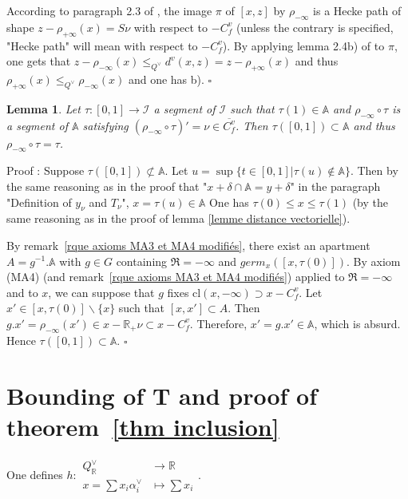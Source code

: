 \documentclass[12pt]{article}
\theoremstyle{plain}
\newtheorem{lemme}[thm]{Lemma}
\theoremstyle{definition}
\newcommand{\R}{\mathbb{R}}
\newcommand{\A}{\mathbb{A}}
\begin{document}
According to paragraph 2.3 of \cite{gaussent2014spherical}, the image $\pi$ of $[x,z]$ by $\rho_{-\infty}$ is a Hecke path of shape $z-\rho_{+\infty}(x)=S\nu$ with respect to $-C^v_f$ (unless the contrary is specified, "Hecke path" will mean with respect to $-C^v_f$). By applying lemma 2.4b) of \cite{gaussent2014spherical} to $\pi$, one gets that $z-\rho_{-\infty}(x)\leq _{Q^\vee} d^v(x,z)=z-\rho_{+\infty}(x)$ and thus $\rho_{+\infty}(x)\leq_{Q^\vee} \rho_{-\infty}(x)$ and one has b). $\square$


\begin{lemme}\label{lemme image réciproque de segments}
Let $\tau:[0,1]\rightarrow \mathcal{I}$ a segment of $\mathcal{I}$ such that $\tau(1)\in \mathbb{A}$ and $\rho_{-\infty}\circ\tau$ is a segment of $\mathbb{A}$ satisfying  $(\rho_{-\infty}\circ\tau)'=\nu\in \overline{C^v_f}$. Then $\tau([0,1])\subset \mathbb{A}$ and thus $\rho_{-\infty}\circ \tau=\tau$.
\end{lemme}

Proof : Suppose $\tau([0,1])\not\subset \A$. Let $u=\sup\{t\in [0,1]|\tau(u)\notin \A\}$. Then by the same reasoning as in the proof that "$x+\delta\cap\A=y+\delta$" in the paragraph "Definition of $y_\nu$ and $T_\nu$", $x=\tau(u)\in\A$ One has $\tau(0)\leq x\leq \tau(1)$ (by the same reasoning as in the proof of lemma \ref{lemme distance vectorielle}). 

By remark~\ref{rque axioms MA3 et MA4 modifiés}, there exist an apartment $A=g^{-1}.\A$ with $g\in G$ containing $\mathfrak{R}=-\infty$ and $germ_x([x,\tau(0)])$. By axiom (MA4) (and remark~\ref{rque axioms MA3 et MA4 modifiés}) applied to $\mathfrak{R}=-\infty$ and to $x$, we can suppose that $g$ fixes $\mathrm{cl}(x,-\infty)\supset x-C_f^v$.  
Let $x'\in [x,\tau(0)]\backslash\{x\}$ such that $[x,x']\subset A$. Then $g.x'=\rho_{-\infty}(x')\in x-\R_+\nu\subset x-C_f^v$. Therefore, $x'=g.x'\in \A$, which is absurd. Hence $\tau([0,1])\subset \A$. $\square$





\section{Bounding of T and proof of theorem~\ref{thm inclusion} }\label{sect bounding of T}


One defines $h:\begin{aligned} Q^\vee_{\mathbb{R}}& \rightarrow \mathbb{R}\\
x=\sum x_i\alpha_i^\vee & \mapsto \sum x_i\end{aligned}.$
\end{document}
